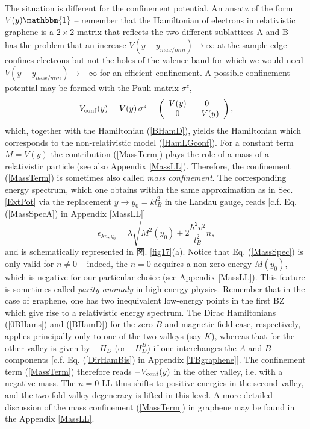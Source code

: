\documentclass[10pt]{book}
\newcommand{\bone}{\mathbbm{1}}
\newcommand{\beq}{\begin{equation}}
\newcommand{\eeq}{\end{equation}}
\begin{document}
The situation is different for the confinement potential. An ansatz of the form $V(y)\bone$ -- remember that the
Hamiltonian of electrons in relativistic graphene is a $2\times 2$ matrix that reflects the two different sublattices A and B --
has the problem that an increase $V(y-y_{max/min})\to \infty$ at the sample edge confines electrons but not the holes
of the valence band for which we would need $V(y-y_{max/min})\to -\infty$ for an efficient confinement. 
A possible confinement potential may be formed with the Pauli matrix $\sigma^z$,
\beq\label{MassTerm}
V_{\rm conf}(y) = V(y)\, \sigma^z=
\left(\begin{array}{cc} V(y) & 0 \\ 0 & - V(y) \end{array}\right),
\eeq
which, together with the Hamiltonian (\ref{BHamD}), yields the Hamiltonian which corresponds to the non-relativistic model
(\ref{HamLGconf}). For a constant term $M=V(y)$ the contribution (\ref{MassTerm}) plays the role 
of a mass of a relativistic particle (see also Appendix \ref{MassLL}). 
Therefore, the confinement (\ref{MassTerm}) is sometimes also called {\sl mass
confinement}. The corresponding energy spectrum, which one obtains within the same approximation as in Sec. \ref{ExtPot}
via the replacement $y\to y_0=kl_B^2$ in the Landau gauge, reads [c.f. Eq. (\ref{MassSpecA}) in Appendix \ref{MassLL}]
\beq\label{MassSpec}
\epsilon_{\lambda n,y_0} = \lambda \sqrt{M^2(y_0) + 2\frac{\hbar^2 v^2}{l_B^2} n}, 
\eeq
and is schematically represented in 图. \ref{fig17}(a). Notice that Eq. (\ref{MassSpec}) is  only valid for
$n\neq0$ -- indeed, the $n=0$ acquires a non-zero energy $M(y_0)$, which is negative for our particular choice
(see Appendix \ref{MassLL}). This 
feature is sometimes called {\sl parity anomaly} in high-energy physics. Remember that in the case of graphene, one 
has two inequivalent low-energy points in the first BZ which give rise to a relativistic energy spectrum.
The Dirac Hamiltonians 
(\ref{0BHams}) and (\ref{BHamD}) for the zero-$B$ and magnetic-field case, respectively, applies principally only to
one of the two valleys (say $K$), whereas that for the other valley is given by $-H_D$ (or $-H_D^B$) if one interchanges
the $A$ and $B$ components [c.f. Eq. (\ref{DirHamBis}) in Appendix 
\ref{TBgraphene}]. The confinement term (\ref{MassTerm}) therefore reads $-V_{\rm conf}(y)$ in the other valley,
i.e. with a negative mass. The $n=0$ LL thus shifts to positive energies in the second valley, and the two-fold valley
degeneracy is lifted in this level. A more detailed discussion of the mass confinement (\ref{MassTerm}) in graphene may be found 
in the Appendix \ref{MassLL}.
\end{document}
